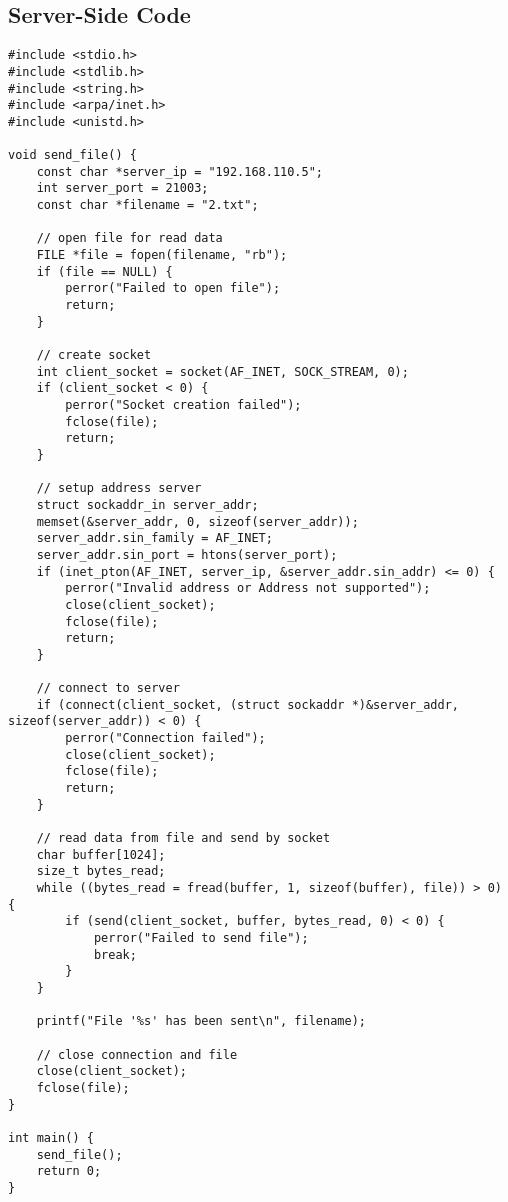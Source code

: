 \documentclass{article}
\begin{document}
\subsection{Server-Side Code}
\begin{verbatim}
#include <stdio.h>
#include <stdlib.h>
#include <string.h>
#include <arpa/inet.h>
#include <unistd.h>

void send_file() {
    const char *server_ip = "192.168.110.5";
    int server_port = 21003;
    const char *filename = "2.txt";

    // open file for read data
    FILE *file = fopen(filename, "rb");
    if (file == NULL) {
        perror("Failed to open file");
        return;
    }

    // create socket
    int client_socket = socket(AF_INET, SOCK_STREAM, 0);
    if (client_socket < 0) {
        perror("Socket creation failed");
        fclose(file);
        return;
    }

    // setup address server
    struct sockaddr_in server_addr;
    memset(&server_addr, 0, sizeof(server_addr));
    server_addr.sin_family = AF_INET;
    server_addr.sin_port = htons(server_port);
    if (inet_pton(AF_INET, server_ip, &server_addr.sin_addr) <= 0) {
        perror("Invalid address or Address not supported");
        close(client_socket);
        fclose(file);
        return;
    }

    // connect to server
    if (connect(client_socket, (struct sockaddr *)&server_addr, sizeof(server_addr)) < 0) {
        perror("Connection failed");
        close(client_socket);
        fclose(file);
        return;
    }

    // read data from file and send by socket
    char buffer[1024];
    size_t bytes_read;
    while ((bytes_read = fread(buffer, 1, sizeof(buffer), file)) > 0) {
        if (send(client_socket, buffer, bytes_read, 0) < 0) {
            perror("Failed to send file");
            break;
        }
    }

    printf("File '%s' has been sent\n", filename);

    // close connection and file
    close(client_socket);
    fclose(file);
}

int main() {
    send_file();
    return 0;
}

\end{verbatim}
\end{document}
